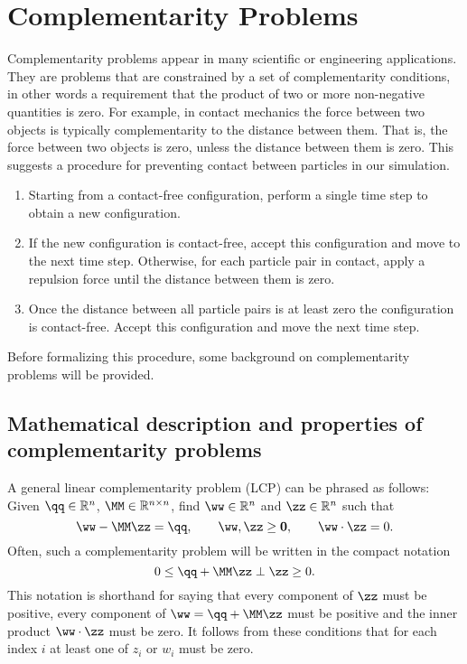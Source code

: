 \chapter{Complementarity Problems}

Complementarity problems appear in many scientific or engineering applications. They are problems that are constrained by a set of complementarity conditions, in other words a requirement that the product of two or more non-negative quantities is zero. For example, in contact mechanics the force between two objects is typically complementarity to the distance between them. That is, the force between two objects is zero, unless the distance between them is zero. This suggests a procedure for preventing contact between particles in our simulation. 
\begin{enumerate}
	\item Starting from a contact-free configuration, perform a single time step to obtain a new configuration.
	\item If the new configuration is contact-free, accept this configuration and move to the next time step. Otherwise, for each particle pair in contact, apply a repulsion force until the distance between them is zero.
	\item Once the distance between all particle pairs is at least zero the configuration is contact-free. Accept this configuration and move the next time step.
\end{enumerate}

Before formalizing this procedure, some background on complementarity problems will be provided.

\section{Mathematical description and properties of complementarity problems}

A general linear complementarity problem (LCP) can be phrased as follows: Given $\qq\in\mathbb{R}^n$, $\MM\in\mathbb{R}^{n\times n}$, find $\ww\in\mathbb{R}^n$ and $\zz\in\mathbb{R}^n$ such that
\begin{equation}\label{eq:lcp} \ww - \MM\zz = \qq,\qquad \ww,\zz\geq \mathbf{0}, \qquad \ww\cdot\zz = 0.\end{equation}
Often, such a complementarity problem will be written in the compact notation 
\[ 0 \leq \qq + \MM\zz\perp \zz \geq 0.\] 
This notation is shorthand for saying that every component of $\zz$ must be positive, every component of $\ww = \qq + \MM\zz$ must be positive and the inner product $\ww\cdot\zz$ must be zero. It follows from these conditions that for each index $i$ at least one of $z_i$ or $w_i$ must be zero.

